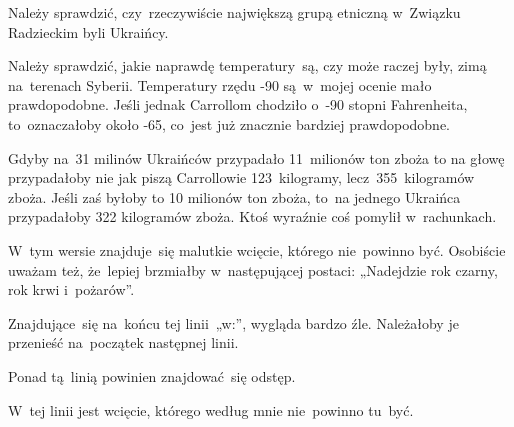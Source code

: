 \documentclass[a4paper,11pt]{article}
\begin{document}
\noindent
{} Należy sprawdzić, czy~rzeczywiście największą grupą etniczną
w~Związku Radzieckim byli Ukraińcy.

\vspace{\spaceFour}





\noindent
{} Należy sprawdzić, jakie naprawdę temperatury~są, czy może raczej
były, zimą na~terenach Syberii. Temperatury rzędu -90\textcelsius
są~w~mojej ocenie mało prawdopodobne. Jeśli jednak Carrollom chodziło
o~-90 stopni Fahrenheita, to~oznaczałoby około -65\textcelsius, co~jest
już znacznie bardziej prawdopodobne.

\vspace{\spaceFour}





\noindent
{} Gdyby na~31 milinów Ukraińców przypadało 11~milionów ton
zboża to na głowę przypadałoby nie jak piszą Carrollowie
123~kilogramy, lecz~355~kilogramów zboża. Jeśli zaś byłoby to 10
milionów ton zboża, to~na jednego Ukraińca przypadałoby 322 kilogramów
zboża. Ktoś wyraźnie coś pomylił w~rachunkach.

\vspace{\spaceFour}





\noindent
{} W~tym wersie znajduje~się malutkie wcięcie, którego
nie~powinno być. Osobiście uważam też, że~lepiej brzmiałby w~następującej
postaci: „Nadejdzie rok czarny, rok krwi i~pożarów”.

\vspace{\spaceFour}





\noindent
{} Znajdujące~się na~końcu tej linii~„w:”, wygląda bardzo źle.
Należałoby je przenieść na~początek następnej linii.

\vspace{\spaceFour}





\noindent
{} Ponad tą~linią powinien znajdować~się odstęp.

\vspace{\spaceFour}





\noindent
{} W~tej linii jest wcięcie, którego według mnie nie~powinno
tu~być.
\end{document}
